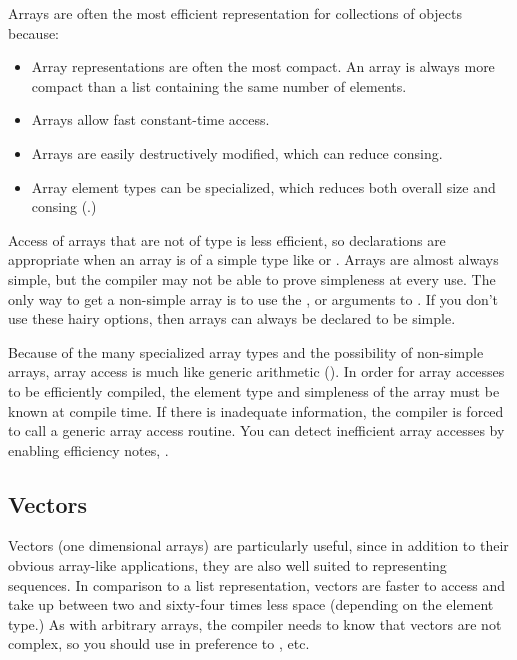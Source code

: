 Arrays are often the most efficient representation for collections of objects
because:
\begin{itemize}
  
\item Array representations are often the most compact.  An array is
  always more compact than a list containing the same number of
  elements.
  
\item Arrays allow fast constant-time access.
  
\item Arrays are easily destructively modified, which can reduce
  consing.
  
\item Array element types can be specialized, which reduces both
  overall size and consing (.)
\end{itemize}


Access of arrays that are not of type  is less
efficient, so declarations are appropriate when an array is of a
simple type like  or .
Arrays are almost always simple, but the compiler may not be able to
prove simpleness at every use.  The only way to get a non-simple array
is to use the ,  or
 arguments to .  If you don't use
these hairy options, then arrays can always be declared to be simple.

Because of the many specialized array types and the possibility of
non-simple arrays, array access is much like generic arithmetic
().  In order for array accesses to be
efficiently compiled, the element type and simpleness of the array
must be known at compile time.  If there is inadequate information,
the compiler is forced to call a generic array access routine.  You
can detect inefficient array accesses by enabling efficiency notes,
.


\subsection{Vectors}

Vectors (one dimensional arrays) are particularly useful, since in
addition to their obvious array-like applications, they are also well
suited to representing sequences.  In comparison to a list
representation, vectors are faster to access and take up between two
and sixty-four times less space (depending on the element type.)  As
with arbitrary arrays, the compiler needs to know that vectors are not
complex, so you should use  in preference to
, etc.


